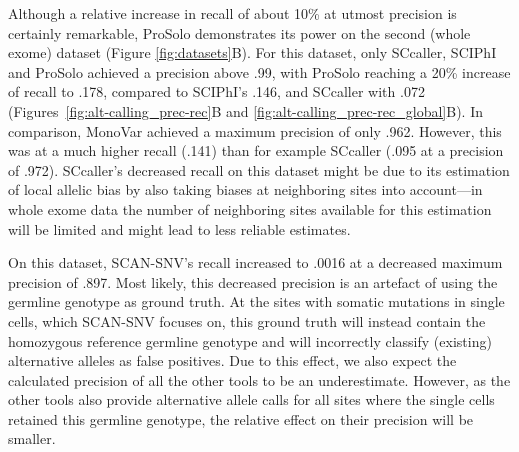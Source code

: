 \documentclass[12pt,inline]{wlscirep}
\begin{document}
Although a relative increase in recall of about 10\% at utmost precision is certainly remarkable, ProSolo demonstrates its power on the second (whole exome) dataset (Figure \ref{fig:datasets}B).
For this dataset, only SCcaller, SCIPhI and ProSolo achieved a precision above .99, with ProSolo reaching a 20\% increase of recall to .178, compared to SCIPhI's .146, and SCcaller with .072 (Figures~\ref{fig:alt-calling_prec-rec}B and \ref{fig:alt-calling_prec-rec_global}B).
In comparison, MonoVar achieved a maximum precision of only .962. However, this was at a much higher recall (.141) than for example SCcaller (.095 at a precision of .972).
SCcaller's decreased recall on this dataset might be due to its estimation of local allelic bias by also taking biases at neighboring sites into account---in whole exome data the number of neighboring sites available for this estimation will be limited and might lead to less reliable estimates.

On this dataset, SCAN-SNV's recall increased to .0016 at a decreased maximum precision of .897.
Most likely, this decreased precision is an artefact of using the germline genotype as ground truth.
At the sites with somatic mutations in single cells, which SCAN-SNV focuses on, this ground truth will instead contain the homozygous reference germline genotype and will incorrectly classify (existing) alternative alleles as false positives.
Due to this effect, we also expect the calculated precision of all the other tools to be an underestimate.
However, as the other tools also provide alternative allele calls for all sites where the single cells retained this germline genotype, the relative effect on their precision will be smaller.
\end{document}
